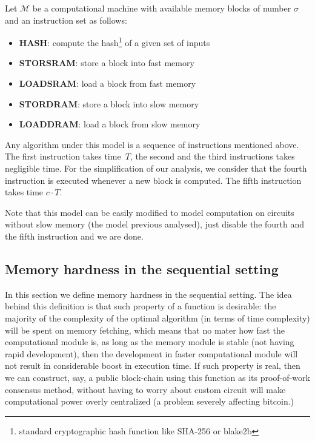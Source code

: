 \begin{definition}\label{def::dramComputationalModel}
  Let $\mathcal{M}$ be a computational machine with available memory blocks of number $\sigma$ and an instruction set as follows:

  \begin{itemize}
    \item \textbf{HASH}: compute the hash\footnote{standard cryptographic hash function like SHA-256 or blake2b} of a given set of inputs
    \item \textbf{STORSRAM}: store a block into fast memory
    \item \textbf{LOADSRAM}: load a block from fast memory
    \item \textbf{STORDRAM}: store a block into slow memory
    \item \textbf{LOADDRAM}: load a block from slow memory
  \end{itemize}

  Any algorithm under this model is a sequence of instructions mentioned above. The first instruction takes time~$T$, the second
  and the third instructions takes negligible time. For the simplification of our analysis, we consider that the fourth instruction
  is executed whenever a new block is computed. The fifth instruction takes time $c \cdot T$.
\end{definition}

Note that this model can be easily modified to model computation on circuits without slow memory (the model previous analysed),
just disable the fourth and the fifth instruction and we are done.

\subsection{Memory hardness in the sequential setting}
In this section we define memory hardness in the sequential setting. The idea behind this definition is that such property of a function
is desirable: the majority of the complexity of the optimal algorithm (in terms of time complexity) will be spent on memory fetching,
which means that no mater how fast the computational module is, as long as the memory module is stable (not having rapid development),
then the development in faster computational module will not result in considerable boost in execution time. If such property is real,
then we can construct, say, a public block-chain using this function as its proof-of-work consensus method, without having to worry about
custom circuit will make computational power overly centralized (a problem severely affecting bitcoin.)


